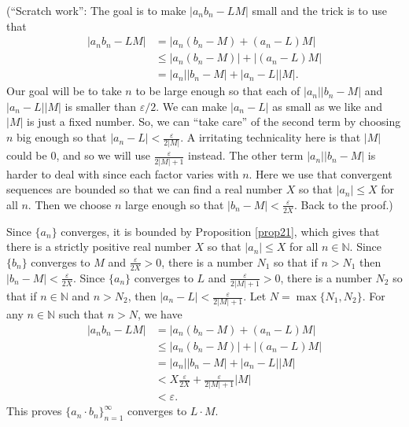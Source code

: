 \documentclass[12pt]{amsart}
\def\e{\varepsilon}
\newcommand{\N}{\mathbb{N}}
\numberwithin{equation}{section}
\theoremstyle{plain} %
\theoremstyle{definition}
\theoremstyle{remark}
\begin{document}
\begin{enumerate}
\begin{framed}
	(``Scratch work'': The goal is to make 
	$|a_nb_n - LM|$ small and the trick is to use that
	$$
	\begin{aligned}
	|a_nb_n - LM| & = |a_n(b_n - M) + (a_n - L)M|  \\
	& \leq |a_n(b_n - M)| + |(a_n - L)M| \\
	& = |a_n| |b_n - M| + |a_n - L| |M|.
	\end{aligned}
	$$
	Our goal will be to take $n$ to be large enough so that each of $|a_n| |b_n - M|$ and $|a_n - L| |M|$ is smaller than $\e/2$.
	We can make $|a_n -L|$ as small as we like and $|M|$ is just a fixed number. So, we can ``take care'' of the second term by choosing $n$ big enough so
	that $|a_n - L| < \frac{\e}{2|M|}$. A irritating technicality here is
	that $|M|$ could be $0$, and so we will use $\frac{\e}{2|M|+1}$ instead. 
	The other term   $|a_n| |b_n - M|$ is harder to deal with since each factor varies with $n$. 
	Here we use that convergent sequences are bounded so that we can find a real number $X$ so that $|a_n| \leq X$ for all $n$. Then we choose $n$ large enough
	so that $|b_n - M| < \frac{\e}{2 X}$. Back to the proof.)
	
	Since $\{a_n\}$ converges, it is bounded by Proposition \ref{prop21}, which gives that  there is a strictly positive real number $X$ so that $|a_n| \leq X$ for all $n \in \N$.
	Since $\{b_n\}$
	converges to $M$ and $\frac{\e}{2 X} > 0$, there is a number $N_1$ so that if $n > N_1$ then $|b_n - M| < \frac{\e}{2 X}$. Since $\{a_n\}$ converges to $L$
	and $\frac{\e}{2|M| + 1} > 0$, there is a number
	$N_2$ so that if $n \in \N$ and $n > N_2$, then $|a_n - L| < \frac{\e}{2|M| + 1}$. Let $N = \max\{N_1, N_2\}$. For any $n \in \N$ such that $n > N$, we have
	$$
	\begin{aligned}
	|a_nb_n - LM| & = |a_n(b_n - M) + (a_n - L)M| \\
	& \leq |a_n(b_n - M)| + |(a_n - L)M| \\
	& = |a_n| |b_n - M| + |a_n - L| |M| \\
	& < X \frac{\e}{2 X} + \frac{\e}{2|M| + 1} |M| \\
	& < \e.
	\end{aligned}
	$$
	This proves $\{a_n  \cdot b_n\}_{n=1}^\infty$ converges to $L \cdot M$.
	\end{framed}
\end{enumerate}
\end{document}
